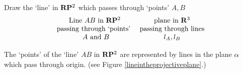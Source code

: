 \documentclass[12pt]{article}
\numberwithin{equation}{section}
\begin{document}
\m

Draw the `line' in ${\bf R}{\bf P}^2$ which passes through `points'  $A,B$
              \begin{equation*}
                  \begin{matrix}
 \hbox {Line $AB$ in ${\bf R}{\bf P}^2$}\cr
 \hbox{passing through `points' }\cr
 \hbox{ $A$ and $B$}\cr
                     \end{matrix}
                          \quad
                   \begin{matrix}
 \hbox {plane in ${\bf R}^3$}\cr
 \hbox{passing through lines}\cr
 \hbox{$l_A,l_B$}\cr
                     \end{matrix}
               \end{equation*}

The `points' of the `line' $AB$  in ${\bf R}{\bf P}^2$ are represented by 
lines in the plane $\alpha$  which pass  through origin.
(see Figure \eqref{lineintheprojectiveplane}.)
\end{document}
